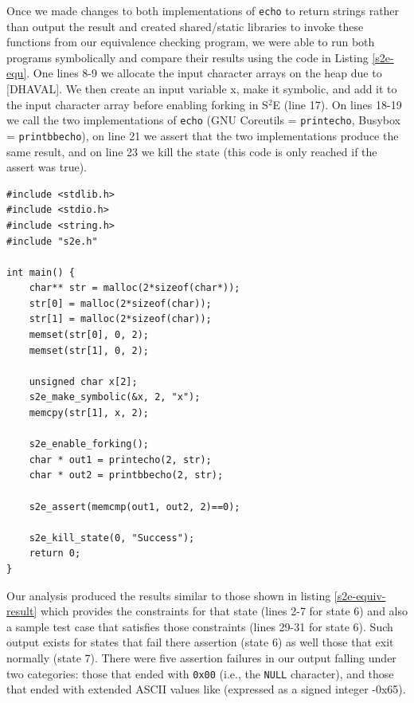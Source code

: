 \documentclass[conference]{IEEEtran}
\begin{document}
Once we made changes to both implementations of {\tt echo} to return strings rather than output the result and created shared/static libraries to invoke these functions from our equivalence checking program, we were able to run both programs symbolically and compare their results using the code in Listing \ref{s2e-equ}. One lines 8-9 we allocate the input character arrays on the heap due to [DHAVAL]. We then create an input variable x, make it symbolic, and add it to the input character array before enabling forking in S$^2$E (line 17). On lines 18-19 we call the two implementations of {\tt echo} (GNU Coreutils = {\tt printecho}, Busybox = {\tt printbbecho}), on line 21 we assert that the two implementations produce the same result, and on line 23 we kill the state (this code is only reached if the assert was true). \\

\begin{lstlisting}[style=C, label=s2e-equ, abovecaptionskip=2ex, captionpos=b, caption={Program used to perform equivalence testing on GNU Coreutils and Busybox}]
#include <stdlib.h>
#include <stdio.h>
#include <string.h>
#include "s2e.h"

int main() {
	char** str = malloc(2*sizeof(char*));
	str[0] = malloc(2*sizeof(char));
	str[1] = malloc(2*sizeof(char));
	memset(str[0], 0, 2);
	memset(str[1], 0, 2);

	unsigned char x[2];
	s2e_make_symbolic(&x, 2, "x");
	memcpy(str[1], x, 2);

	s2e_enable_forking();
	char * out1 = printecho(2, str);
	char * out2 = printbbecho(2, str);

	s2e_assert(memcmp(out1, out2, 2)==0);
    
	s2e_kill_state(0, "Success");
	return 0;
}
\end{lstlisting}

Our analysis produced the results similar to those shown in listing \ref{s2e-equiv-result} which provides the constraints for that state (lines 2-7 for state 6) and also a sample test case that satisfies those constraints (lines 29-31 for state 6). Such output exists for states that fail there assertion (state 6) as well those that exit normally (state 7). There were five assertion failures in our output falling under two categories: those that ended with {\tt 0x00} (i.e., the {\tt NULL} character), and those that ended with extended ASCII values like {\corner} (expressed as a signed integer -0x65). \\
\end{document}
